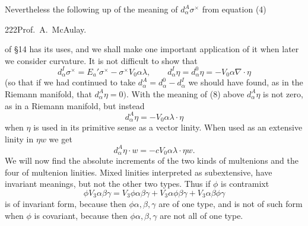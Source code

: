 \documentclass[11pt]{article}
\begin{document}
\indent Nevertheless the following up of the meaning of $d_{\alpha}^{A}\sigma^\times$ from equation (4)
\newpage\thispagestyle{empty}\begin{center}222\hfill Prof.\ A.\ McAulay.\end{center}
of §14 has its uses, and we shall make one important application of it when later we consider curvature. It is not difficult to show that
\begin{equation}d_{\alpha}^{I}\sigma^\times=E_a'\sigma^\times-\sigma^\times V_0\alpha\lambda,\qquad d_{\alpha}^{I}\eta=d_{\alpha}^{0}\eta=-V_0\alpha\nabla\cdot\eta\tag{9}\end{equation}
(so that if we had continued to take $d_{\alpha}^{A}=d_{\alpha}^{0}-d_{\alpha}^{I}$ we should have found, as in the Riemann manifold, that $d_{\alpha}^{A}\eta=0).$ With the meaning of (8) above $d_{\alpha}^{A}\eta$ is not zero, as in a Riemann manifold, but instead
\[
d_{\alpha}^{A}\eta=-V_0\alpha\lambda\cdot\eta
\]
when $\eta$ is used in its primitive sense as a vector linity. When used as an extensive linity in $\eta w$ we get
\begin{equation}d_{\alpha}^{A}\eta\cdot w=-cV_0\alpha\lambda\cdot\eta w.\tag{10}\end{equation}
We will now find the absolute increments of the two kinds of multenions and the four of multenion linities. Mixed linities interpreted as subextensive, have invariant meanings, but not the other two types. Thus if $\phi$ is contramixt
\[
\phi V_3\alpha\beta\gamma=V_3\phi\alpha\beta\gamma+V_3\alpha\phi\beta\gamma+V_3\alpha\beta\phi\gamma
\]
is of invariant form, because then $\phi\alpha,\beta,\gamma$ are of one type, and is not of such form when $\phi$ is covariant, because then $\phi\alpha,\beta,\gamma$ are not all of one type.
\end{document}
